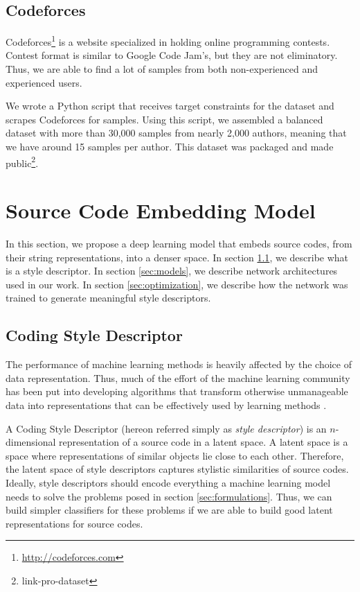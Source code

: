 \subsection{Codeforces}\label{sec:codeforces}

Codeforces\footnote{\url{http://codeforces.com}} is a website specialized in holding online programming contests. Contest format is similar to Google Code Jam's, but they are not eliminatory. Thus, we are able to find a lot of samples from both non-experienced and experienced users.

We wrote a Python script that receives target constraints for the dataset and scrapes Codeforces for samples. Using this script, we assembled a balanced dataset with more than 30,000 samples from nearly 2,000 authors, meaning that we have around 15 samples per author. This dataset was packaged and made public\footnote{link-pro-dataset}.

\section{Source Code Embedding Model}\label{sec:framework}

In this section, we propose a deep learning model that embeds source codes, from their string representations, into a denser space. In section \ref{sec:descriptor}, we describe what is a style descriptor. In section \ref{sec:models}, we describe network architectures used in our work. In section \ref{sec:optimization}, we describe how the network was trained to generate meaningful style descriptors.

\subsection{Coding Style Descriptor}\label{sec:descriptor}

The performance of machine learning methods is heavily affected by the choice of data representation. Thus, much of the effort of the machine learning community has been put into developing algorithms that transform otherwise unmanageable data into representations that can be effectively used by learning methods \cite{representation_learning}.

A Coding Style Descriptor (hereon referred simply as \textit{style descriptor}) is an $n$-dimensional representation of a source code in a latent space. A latent space is a space where representations of similar objects lie close to each other. Therefore, the latent space of style descriptors captures stylistic similarities of source codes. Ideally, style descriptors should encode everything a machine learning model needs to solve the problems posed in section \ref{sec:formulations}. Thus, we can build simpler classifiers for these problems if we are able to build good latent representations for source codes.

